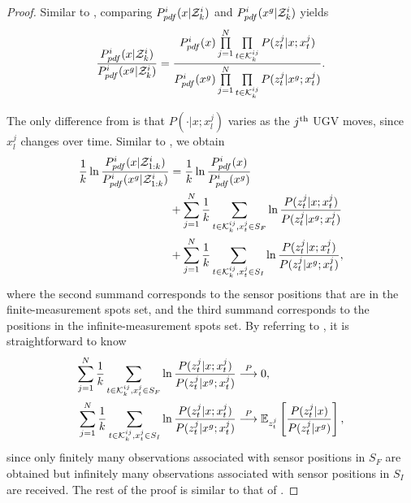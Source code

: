 	\begin{proof}		
		Similar to , comparing $P^i_{pdf}(x|\mathcal{Z}^i_k)$ and $P^i_{pdf}(x^g|\mathcal{Z}^i_k)$ yields		
		\small\begin{equation}\label{eqn:cmp2}
		\frac{P^i_{pdf}(x|\mathcal{Z}^i_k)}{P^i_{pdf}(x^g|\mathcal{Z}^i_k)}=\frac{P^i_{pdf}(x)\prod\limits_{j=1}^{N}\prod\limits_{t\in\mathcal{K}^{ij}_{k}}P(z^j_t|x;x^j_t)}{P^i_{pdf}(x^g)\prod\limits_{j=1}^{N}\prod\limits_{t\in\mathcal{K}^{ij}_{k}}P(z^j_t|x^g;x^j_t)}.
		\end{equation}\normalsize
			
		\textcolor{\revcol}{
		The only difference from  is that $P(\cdot|x;x^j_l)$ varies as the $j^\text{th}$ UGV moves, since $x^j_l$ changes over time.
		Similar to , we obtain 
		\begin{equation*}
		\begin{split}
		\frac{1}{k}\ln\frac{P^i_{pdf}(x|\mathcal{Z}^i_{1:k})}{P^i_{pdf}(x^g|\mathcal{Z}^i_{1:k})}&=\frac{1}{k}\ln\frac{P^i_{pdf}(x)}{P^i_{pdf}(x^g)}\\
		&+\sum\limits_{j=1}^{N}\frac{1}{k}\sum\limits_{t\in\mathcal{K}^{ij}_{k},x^j_t\in S_F}\ln\frac{P(z^j_t|x;x^j_t)}{P(z^j_t|x^g;x^j_t)}\\
		&+\sum\limits_{j=1}^{N}\frac{1}{k}\sum\limits_{t\in\mathcal{K}^{ij}_{k},x^j_t\in S_I}\ln\frac{P(z^j_t|x;x^j_t)}{P(z^j_t|x^g;x^j_t)},
		\end{split}		
		\end{equation*}
		where the second summand corresponds to the sensor positions that are in the finite-measurement spots set, and the third summand corresponds to the positions in the infinite-measurement spots set. 
		By referring to , it is straightforward to know
		\begin{equation*}
		\begin{split}
		\sum\limits_{j=1}^{N}\frac{1}{k}\sum\limits_{t\in\mathcal{K}^{ij}_{k},x^j_t\in S_F}\ln\frac{P(z^j_t|x;x^j_t)}{P(z^j_t|x^g;x^j_t)}&\overset{P}{\longrightarrow} 0,\\
		\sum\limits_{j=1}^{N}\frac{1}{k}\sum\limits_{t\in\mathcal{K}^{ij}_{k},x^j_t\in S_I}\ln\frac{P(z^j_t|x;x^j_t)}{P(z^j_t|x^g;x^j_t)}&\overset{P}{\longrightarrow} \mathbb{E}_{z^j_t} \left[\frac{P(z^j_t|x)}{P(z^j_t|x^g)}\right],
		\end{split}		
		\end{equation*}
		since only finitely many observations associated with sensor positions in $S_F$ are obtained but infinitely many observations associated with sensor positions in $S_I$ are received.
		The rest of the proof is similar to that of .}
		
	\end{proof}
			
